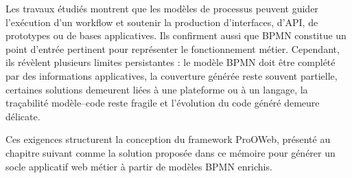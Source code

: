 
Les travaux étudiés montrent que les modèles de processus peuvent guider l'exécution d'un workflow et soutenir la production d'interfaces, d'API, de prototypes ou de bases applicatives. Ils confirment aussi que BPMN constitue un point d'entrée pertinent pour représenter le fonctionnement métier. Cependant, ils révèlent plusieurs limites persistantes : le modèle BPMN doit être complété par des informations applicatives, la couverture générée reste souvent partielle, certaines solutions demeurent liées à une plateforme ou à un langage, la traçabilité modèle--code reste fragile et l'évolution du code généré demeure délicate.


Ces exigences structurent la conception du framework ProOWeb, présenté au chapitre suivant comme la solution proposée dans ce mémoire pour générer un socle applicatif web métier à partir de modèles BPMN enrichis.
